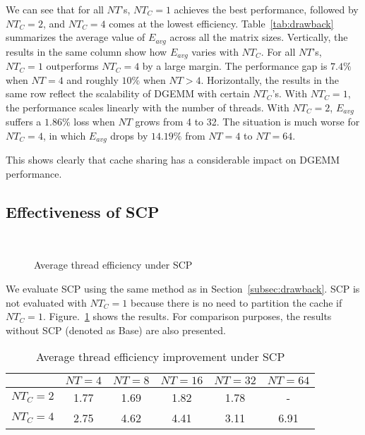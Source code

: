 We can see that for all $NT$'s, $NT_C=1$ achieves the 
best performance, followed by 
$NT_C=2$, and $NT_C=4$ comes at the lowest efficiency.
Table~\ref{tab:drawback} summarizes the average value
of $E_{avg}$ across all the matrix sizes.
Vertically, the results in the same column show how $E_{avg}$ varies with $NT_C$.
For all $NT$'s, $NT_C=1$ outperforms $NT_C=4$ by a large margin.
The performance gap is $7.4\%$ when $NT=4$ and roughly $10\%$ when $NT>4$.
Horizontally,  the results in the same row reflect the scalability of
DGEMM with certain $NT_C$'s.
With $NT_C=1$, the performance scales linearly with the number of threads.
With $NT_C=2$, $E_{avg}$ suffers a $1.86\%$ loss when $NT$ grows from 4 to 32.
The situation is much worse for $NT_C=4$, in which
$E_{avg}$ drops by $14.19\%$ from
$NT=4$ to $NT=64$.

This shows clearly that cache sharing has a considerable
impact on DGEMM performance. 

\subsection{Effectiveness of SCP}\label{subsec:benefit}

\begin{figure}
  \centering
  \\
  \caption{Average thread efficiency under SCP}
  \label{fig:benefit}
\end{figure}

We evaluate SCP using the same method as in Section~\ref{subsec:drawback}.
SCP is not evaluated with $NT_C=1$ because there is no need
to partition the cache if $NT_C=1$.
Figure.~\ref{fig:benefit} shows the results.
For comparison purposes, the results without SCP
(denoted as Base) are also presented.

\begin{table}
  \centering
  \caption{Average thread efficiency improvement under SCP}
  \label{tab:win}
  \setlength{\tabcolsep}{3.5pt}
  \begin{tabular}{cccccc}
    \toprule
     & $NT=4$ & $NT=8$ & $NT=16$ & $NT=32$ & $NT=64$ \\
    \midrule
    $NT_C=2$ & 1.77 & 1.69 & 1.82 & 1.78 & - \\
    $NT_C=4$ & 2.75 & 4.62 & 4.41 & 3.11 & 6.91 \\
    \bottomrule
  \end{tabular}
\end{table}

